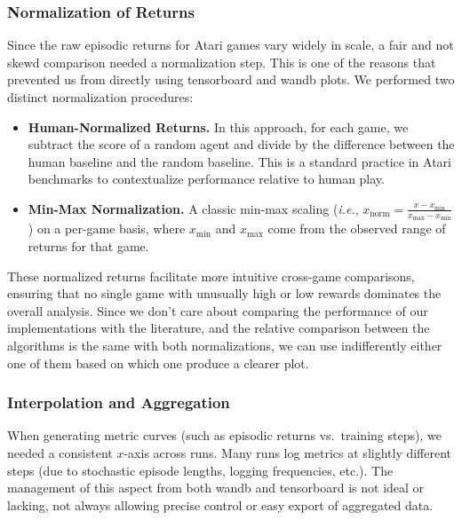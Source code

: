 \subsubsection{Normalization of Returns}
\label{subsubsec:normalization}
Since the raw episodic returns for Atari games vary widely in scale, a fair and not skewd comparison needed a normalization step. This is one of the reasons that prevented us from directly using tensorboard and wandb plots. We performed two distinct normalization procedures:
\begin{itemize}
	\item \textbf{Human-Normalized Returns.} In this approach, for each game, we subtract the score of a random agent and divide by the difference between the human baseline and the random baseline. This is a standard practice in Atari benchmarks to contextualize performance relative to human play.
	\item \textbf{Min-Max Normalization.} A classic min-max scaling (\emph{i.e.}, $x_{\text{norm}} = \frac{x - x_{\min}}{x_{\max} - x_{\min}}$) on a per-game basis, where $x_{\min}$ and $x_{\max}$ come from the observed range of returns for that game.
\end{itemize}
These normalized returns facilitate more intuitive cross-game comparisons, ensuring that no single game with unusually high or low rewards dominates the overall analysis. Since we don't care about comparing the performance of our implementations with the literature, and the relative comparison between the algorithms is the same with both normalizations, we can use indifferently either one of them based on which one produce a clearer plot.

\subsubsection{Interpolation and Aggregation}
When generating metric curves (such as episodic returns vs.\ training steps), we needed a consistent $x$-axis across runs. Many runs log metrics at slightly different steps (due to stochastic episode lengths, logging frequencies, etc.). The management of this aspect from both wandb and tensorboard is not ideal or lacking, not always allowing precise control or easy export of aggregated data.

